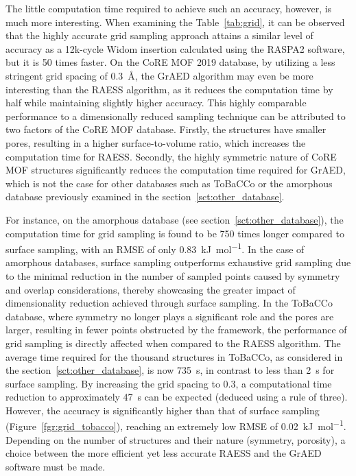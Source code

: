 \documentclass[main]{subfiles}
\begin{document}
The little computation time required to achieve such an accuracy, however, is much more interesting. When examining the Table~\ref{tab:grid}, it can be observed that the highly accurate grid sampling approach attains a similar level of accuracy as a 12k-cycle Widom insertion calculated using the RASPA2 software, but it is 50 times faster. On the CoRE MOF 2019 database, by utilizing a less stringent grid spacing of \SI{0.3}{\angstrom}, the GrAED algorithm may even be more interesting than the RAESS algorithm, as it reduces the computation time by half while maintaining slightly higher accuracy. This highly comparable performance to a dimensionally reduced sampling technique can be attributed to two factors of the CoRE MOF database. Firstly, the structures have smaller pores, resulting in a higher surface-to-volume ratio, which increases the computation time for RAESS. Secondly, the highly symmetric nature of CoRE MOF structures significantly reduces the computation time required for GrAED, which is not the case for other databases such as ToBaCCo or the amorphous database previously examined in the section~\ref{sct:other_database}. 

For instance, on the amorphous database (see section~\ref{sct:other_database}), the computation time for grid sampling is found to be 750 times longer compared to surface sampling, with an RMSE of only \SI{0.83}{\kJ\per\mol}. In the case of amorphous databases, surface sampling outperforms exhaustive grid sampling due to the minimal reduction in the number of sampled points caused by symmetry and overlap considerations, thereby showcasing the greater impact of dimensionality reduction achieved through surface sampling. In the ToBaCCo database,\autocite{Colon_2017} where symmetry no longer plays a significant role and the pores are larger, resulting in fewer points obstructed by the framework, the performance of grid sampling is directly affected when compared to the RAESS algorithm. The average time required for the thousand structures in ToBaCCo, as considered in the section~\ref{sct:other_database}, is now \SI{735}{\s}, in contrast to less than \SI{2}{\s} for surface sampling. By increasing the grid spacing to $0.3$, a computational time reduction to approximately \SI{47}{\s} can be expected (deduced using a rule of three). However, the accuracy is significantly higher than that of surface sampling (Figure~\ref{fgr:grid_tobacco}), reaching an extremely low RMSE of \SI{0.02}{\kJ\per\mol}. Depending on the number of structures and their nature (symmetry, porosity), a choice between the more efficient yet less accurate RAESS and the GrAED software must be made.
\end{document}
